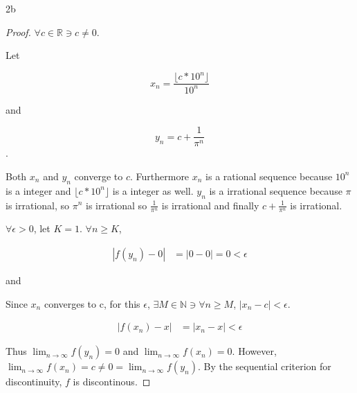 \documentclass{article}
\newcommand{\R}{\mathbb{R}}
\newcommand{\N}{\mathbb{N}}
\newcommand{\abs}[1]{\left\lvert #1\right\rvert}
\newcommand{\floor}[1]{\lfloor{#1}\rfloor}
\begin{document}
\begin{PROB}{2b}\label{Problem 2b.}
\end{PROB}
\begin{proof}
    $\forall c \in \R \ni c \neq 0$. 
     
    Let
    
    \begin{equation*}
        x_n = \frac{\floor{c * 10^n}}{10^n}
    \end{equation*}

    and

    \begin{equation*}
        y_n = c + \frac{1}{\pi^n} 
    \end{equation*}. 

    Both $x_n$ and $y_n$ converge to $c$. Furthermore $x_n$ is a rational sequence because $10^n$ is a integer and $\floor{c * 10^n}$ is a integer as well. $y_n$ is a irrational sequence because $\pi$ is irrational, so $\pi^n$ is irrational so $\frac{1}{\pi^n}$ is irrational and finally $c+ \frac{1}{\pi^n}$ is irrational.
    
    $\forall \epsilon > 0$, let $K = 1$. $\forall n \geq K$, 
    
    \begin{align*}
        \abs{f(y_n) - 0} &= \abs{0 - 0} = 0 < \epsilon 
    \end{align*}

    and

    Since $x_n$ converges to c, for this $\epsilon$, $\exists M \in \N \ni \forall n \geq M$, $\abs{x_n - c} < \epsilon$.    
    
    \begin{align*}
        \abs{f(x_n) - x} &= \abs{x_n - x} < \epsilon
    \end{align*}

    Thus $\lim_{n \to \infty} f(y_n) = 0$ and $\lim_{n \to \infty} f(x_n) = 0$. However, $\lim_{n \to \infty} f(x_n) = c \neq  0 = \lim_{n \to \infty} f(y_n)$. By the sequential criterion for discontinuity, $f$ is discontinous.  
\end{proof}

\bigskip
\end{document}
